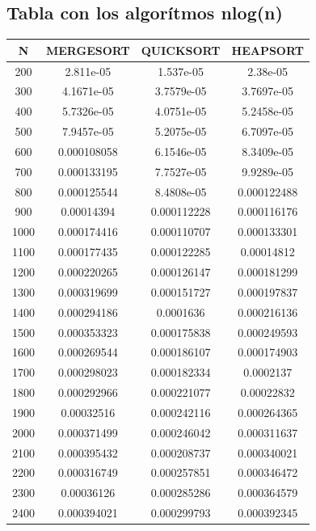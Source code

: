\documentclass[11pt,spanish]{article} %
\begin{document}
\subsection{Tabla con los algor\'itmos nlog(n)}
\begin{center}
\begin{longtable}{|c|c|c|c|}
\hline
N    & MERGESORT   & QUICKSORT   & HEAPSORT    \\ \hline
200  & 2.811e-05   & 1.537e-05   & 2.38e-05    \\ \hline
300  & 4.1671e-05  & 3.7579e-05  & 3.7697e-05  \\ \hline
400  & 5.7326e-05  & 4.0751e-05  & 5.2458e-05  \\ \hline
500  & 7.9457e-05  & 5.2075e-05  & 6.7097e-05  \\ \hline
600  & 0.000108058 & 6.1546e-05  & 8.3409e-05  \\ \hline
700  & 0.000133195 & 7.7527e-05  & 9.9289e-05  \\ \hline
800  & 0.000125544 & 8.4808e-05  & 0.000122488 \\ \hline
900  & 0.00014394  & 0.000112228 & 0.000116176 \\ \hline
1000 & 0.000174416 & 0.000110707 & 0.000133301 \\ \hline
1100 & 0.000177435 & 0.000122285 & 0.00014812  \\ \hline
1200 & 0.000220265 & 0.000126147 & 0.000181299 \\ \hline
1300 & 0.000319699 & 0.000151727 & 0.000197837 \\ \hline
1400 & 0.000294186 & 0.0001636   & 0.000216136 \\ \hline
1500 & 0.000353323 & 0.000175838 & 0.000249593 \\ \hline
1600 & 0.000269544 & 0.000186107 & 0.000174903 \\ \hline
1700 & 0.000298023 & 0.000182334 & 0.0002137   \\ \hline
1800 & 0.000292966 & 0.000221077 & 0.00022832  \\ \hline
1900 & 0.00032516  & 0.000242116 & 0.000264365 \\ \hline
2000 & 0.000371499 & 0.000246042 & 0.000311637 \\ \hline
2100 & 0.000395432 & 0.000208737 & 0.000340021 \\ \hline
2200 & 0.000316749 & 0.000257851 & 0.000346472 \\ \hline
2300 & 0.00036126  & 0.000285286 & 0.000364579 \\ \hline
2400 & 0.000394021 & 0.000299793 & 0.000392345 \\ \hline

\end{longtable}
\end{center}
\end{document}
